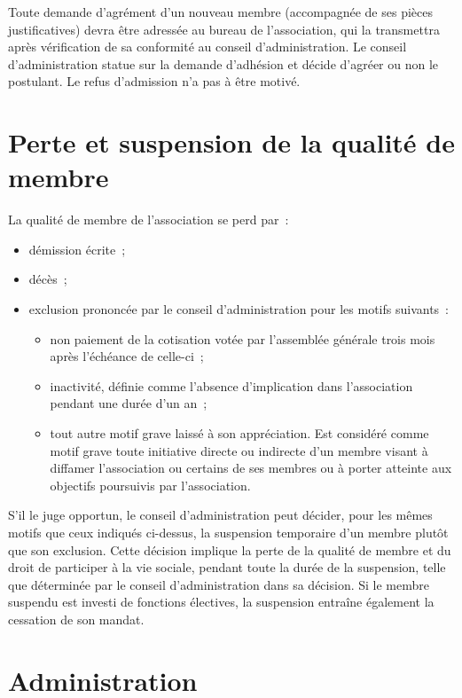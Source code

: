 \documentclass{article}
\begin{document}
Toute demande d'agrément d'un nouveau membre (accompagnée de ses
pièces justificatives) devra être adressée au bureau de l'association,
qui la transmettra après vérification de sa conformité au conseil
d'administration. Le conseil d'administration statue sur la demande
d'adhésion et décide d'agréer ou non le postulant. Le refus
d'admission n'a pas à être motivé.

\section{Perte et suspension de la qualité de membre}
\label{sec:perte-et-suspension-de-la-qualite-de-membre}

La qualité de membre de l'association se perd par :

\begin{itemize}
\item démission écrite~;
\item décès~;
\item exclusion prononcée par le conseil d'administration pour les
  motifs suivants~:
  \begin{itemize}
  \item non paiement de la cotisation votée par l'assemblée générale
    trois mois après l'échéance de celle-ci~;
  \item inactivité, définie comme l'absence d'implication dans
    l'association pendant une durée d'un an~;
  \item tout autre motif grave laissé à son appréciation. Est
    considéré comme motif grave toute initiative directe ou indirecte
    d'un membre visant à diffamer l'association ou certains de ses
    membres ou à porter atteinte aux objectifs poursuivis par
    l'association.
  \end{itemize}
\end{itemize}

S'il le juge opportun, le conseil d'administration peut décider, pour
les mêmes motifs que ceux indiqués ci-dessus, la suspension temporaire
d'un membre plutôt que son exclusion.  Cette décision implique la
perte de la qualité de membre et du droit de participer à la vie
sociale, pendant toute la durée de la suspension, telle que déterminée
par le conseil d'administration dans sa décision. Si le membre
suspendu est investi de fonctions électives, la suspension entraîne
également la cessation de son mandat.

\section{Administration}
\label{sec:administration}
\end{document}
